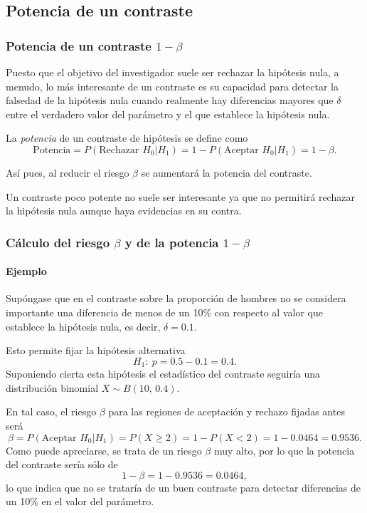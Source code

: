 \subsection{Potencia de un contraste}
\begin{frame}
\frametitle{Potencia de un contraste $1-\beta$}
Puesto que el objetivo del investigador suele ser rechazar la hipótesis nula, a menudo, lo más interesante de un contraste es su capacidad para detectar la falsedad de la hipótesis nula cuando realmente hay diferencias mayores que $\delta$ entre el verdadero valor del parámetro y el que establece la hipótesis nula.

\begin{definicion}
La \emph{potencia} de un contraste de hipótesis se define como
\[
\text{Potencia} = P(\text{Rechazar }H_0|H_1) = 1 - P(\text{Aceptar }H_0|H_1) = 1-\beta.
\]
\end{definicion}

Así pues, al reducir el riesgo $\beta$ se aumentará la potencia del contraste.

Un contraste poco potente no suele ser interesante ya que no permitirá rechazar la hipótesis nula aunque haya evidencias en su contra.
\end{frame}


\begin{frame}
\frametitle{Cálculo del riesgo $\beta$ y de la potencia $1-\beta$}
\framesubtitle{Ejemplo}
Supóngase que en el contraste sobre la proporción de hombres no se considera importante una diferencia de menos de un 10\% con respecto al valor que establece la hipótesis nula, es decir, $\delta=0.1$.

Esto permite fijar la hipótesis alternativa
\[
H_1:\ p=0.5-0.1=0.4.
\]
Suponiendo cierta esta hipótesis el estadístico del contraste seguiría una distribución binomial $X\sim B(10,\,0.4)$.

En tal caso, el riesgo $\beta$ para las regiones de aceptación y rechazo fijadas antes será
\[
\beta = P(\text{Aceptar }H_0|H_1) = P(X\geq 2) = 1 - P(X<2) = 1-0.0464 = 0.9536.
\]
Como puede apreciarse, se trata de un riesgo $\beta$ muy alto, por lo que la potencia del contraste sería sólo de
\[
1-\beta = 1-0.9536 = 0.0464,
\]
lo que indica que no se trataría de un buen contraste para detectar diferencias de un 10\% en el valor del parámetro.
\end{frame}


